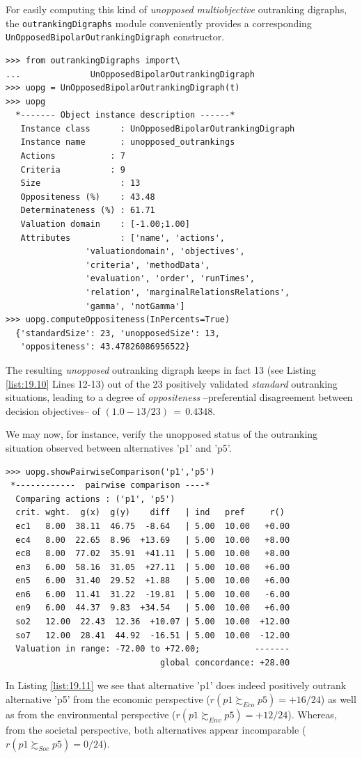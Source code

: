 For easily computing this kind of \emph{unopposed multiobjective} outranking digraphs, the \texttt{outrankingDigraphs} module conveniently provides a corresponding\\
\texttt{UnOpposedBipolarOutrankingDigraph} constructor.
\begin{lstlisting}[caption={Unopposed outranking digraph constructor},label=list:19.10]
>>> from outrankingDigraphs import\
...              UnOpposedBipolarOutrankingDigraph
>>> uopg = UnOpposedBipolarOutrankingDigraph(t)
>>> uopg
  *------- Object instance description ------*
   Instance class      : UnOpposedBipolarOutrankingDigraph
   Instance name       : unopposed_outrankings
   Actions           : 7
   Criteria          : 9
   Size                : 13
   Oppositeness (%)    : 43.48
   Determinateness (%) : 61.71
   Valuation domain    : [-1.00;1.00]
   Attributes          : ['name', 'actions',
                'valuationdomain', 'objectives',
                'criteria', 'methodData',
                'evaluation', 'order', 'runTimes',
                'relation', 'marginalRelationsRelations',
                'gamma', 'notGamma']
>>> uopg.computeOppositeness(InPercents=True)
  {'standardSize': 23, 'unopposedSize': 13,
   'oppositeness': 43.47826086956522}			   
\end{lstlisting}
The resulting \emph{unopposed} outranking digraph keeps in fact 13 (see Listing \ref{list:19.10} Lines 12-13) out of the 23 positively validated \emph{standard} outranking situations, leading to a degree of \emph{oppositeness} --preferential disagreement between decision objectives-- of $(1.0 - 13/23)\,=\,0.4348$.

We may now, for instance, verify the unopposed status of the outranking situation observed between alternatives 'p1' and 'p5'.
\begin{lstlisting}[caption={Example of unopposed multiobjective outranking situation},label=list:19.11]
>>> uopg.showPairwiseComparison('p1','p5')
 *------------  pairwise comparison ----*
  Comparing actions : ('p1', 'p5')
  crit. wght.  g(x)  g(y)    diff   | ind   pref     r()
  ec1   8.00  38.11  46.75  -8.64   | 5.00  10.00   +0.00
  ec4   8.00  22.65  8.96  +13.69   | 5.00  10.00   +8.00
  ec8   8.00  77.02  35.91  +41.11  | 5.00  10.00   +8.00
  en3   6.00  58.16  31.05  +27.11  | 5.00  10.00   +6.00
  en5   6.00  31.40  29.52  +1.88   | 5.00  10.00   +6.00
  en6   6.00  11.41  31.22  -19.81  | 5.00  10.00   -6.00
  en9   6.00  44.37  9.83  +34.54   | 5.00  10.00   +6.00
  so2   12.00  22.43  12.36  +10.07 | 5.00  10.00  +12.00
  so7   12.00  28.41  44.92  -16.51 | 5.00  10.00  -12.00
  Valuation in range: -72.00 to +72.00;           -------
                               global concordance: +28.00
\end{lstlisting}
In Listing \ref{list:19.11} we see that alternative 'p1' does indeed positively outrank alternative 'p5' from the economic perspective ($r(p1 \succsim_{Eco} p5) = +16/24$) as well as from the environmental perspective ($r(p1 \succsim_{Env} p5) = +12/24$). Whereas, from the societal perspective, both alternatives appear incomparable ($r(p1 \succsim_{Soc} p5) = 0/24$).


